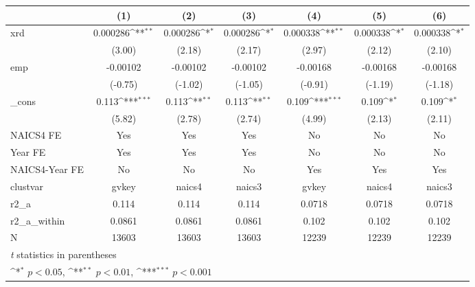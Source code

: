 {
\def\sym#1{\ifmmode^{#1}\else\(^{#1}\)\fi}
\begin{tabular}{l*{6}{c}}
\hline\hline
            &\multicolumn{1}{c}{(1)}         &\multicolumn{1}{c}{(2)}         &\multicolumn{1}{c}{(3)}         &\multicolumn{1}{c}{(4)}         &\multicolumn{1}{c}{(5)}         &\multicolumn{1}{c}{(6)}         \\
\hline
xrd         &    0.000286\sym{**} &    0.000286\sym{*}  &    0.000286\sym{*}  &    0.000338\sym{**} &    0.000338\sym{*}  &    0.000338\sym{*}  \\
            &      (3.00)         &      (2.18)         &      (2.17)         &      (2.97)         &      (2.12)         &      (2.10)         \\
[1em]
emp         &    -0.00102         &    -0.00102         &    -0.00102         &    -0.00168         &    -0.00168         &    -0.00168         \\
            &     (-0.75)         &     (-1.02)         &     (-1.05)         &     (-0.91)         &     (-1.19)         &     (-1.18)         \\
[1em]
\_cons      &       0.113\sym{***}&       0.113\sym{**} &       0.113\sym{**} &       0.109\sym{***}&       0.109\sym{*}  &       0.109\sym{*}  \\
            &      (5.82)         &      (2.78)         &      (2.74)         &      (4.99)         &      (2.13)         &      (2.11)         \\
[1em]
NAICS4 FE   &         Yes         &         Yes         &         Yes         &          No         &          No         &          No         \\
[1em]
Year FE     &         Yes         &         Yes         &         Yes         &          No         &          No         &          No         \\
[1em]
NAICS4-Year FE&          No         &          No         &          No         &         Yes         &         Yes         &         Yes         \\
\hline
clustvar    &       gvkey         &      naics4         &      naics3         &       gvkey         &      naics4         &      naics3         \\
r2\_a        &       0.114         &       0.114         &       0.114         &      0.0718         &      0.0718         &      0.0718         \\
r2\_a\_within &      0.0861         &      0.0861         &      0.0861         &       0.102         &       0.102         &       0.102         \\
N           &       13603         &       13603         &       13603         &       12239         &       12239         &       12239         \\
\hline\hline
\multicolumn{7}{l}{\footnotesize \textit{t} statistics in parentheses}\\
\multicolumn{7}{l}{\footnotesize \sym{*} \(p<0.05\), \sym{**} \(p<0.01\), \sym{***} \(p<0.001\)}\\
\end{tabular}
}
